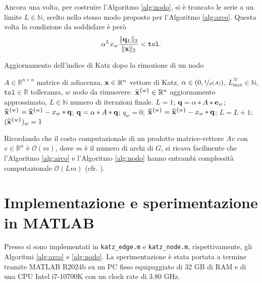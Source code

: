 \documentclass[a4paper]{article}
\newcommand{\NN}{\mathbb{N}}
\newcommand{\RR}{\mathbb{R}}
\newcommand{\evec}{{\bf e}}
\newcommand{\avec}{{\bf a}}
\newcommand{\qvec}{{\bf q}}
\newcommand{\xvec}{{\bf x}}
\newcommand{\cN}{\mathcal{N}}
\begin{document}
	Ancora una volta, per costruire l'Algoritmo \ref{alg:nodo}, si è troncato
	le serie a un limite $L \in \NN$, scelto nello stesso modo proposto
	per l'Algoritmo \ref{alg:arco}. Questa volta la condizione da soddisfare
	è però
	\[
		\alpha^L x_w \frac{\|\qvec_L\|_2}{\|\xvec\|_2} < \texttt{tol}.
	\]
	
	\begin{algorithm}[H]
		\caption{Aggiornamento dell'indice di Katz dopo la rimozione di un nodo}
		\label{alg:nodo}
		\begin{algorithmic}[1]
			\REQUIRE $A\in \RR^{n\times n}$ matrice di adiacenza, $\xvec\in \RR^{n}$ vettore di Katz, $\alpha \in (0,\nicefrac{1}{\rho(A)})$, $L_{\max}^{\cN} \in \NN$, $\texttt{tol}\in \RR$ tolleranza, $w$ nodo da rimuovere. 
			\ENSURE $\widehat{\xvec}^{\{w\}} \in \RR^{n}$ aggiornamento approssimato, $L\in \NN$ numero di iterazioni finale. 
			\STATE {$\widehat{\xvec}^{\{w\}}=\xvec$;}
			\STATE $L = 1$;
			\STATE $\qvec = \alpha* A*\evec_w$;
			\STATE $\widehat{\xvec}^{\{w\}} = \widehat{\xvec}^{\{w\}} - x_w *\qvec$;
			\WHILE {$x_w\|\qvec\|_{2}\,/\,\|\xvec\|_2  >  \texttt{tol}$ \AND  $L< L_{\max}^{\cN}$}
			\STATE $\qvec = \alpha*A*\qvec$; \label{line:compute_fpw}\label{line:mat_prod_node}
			\STATE $q_w = 0$;
			\STATE $\widehat{\xvec}^{\{w\}} = \widehat{\xvec}^{\{w\}} - x_w *\qvec$;\label{line:compute_x_w_hat} 
			\STATE $L=L+1$;
			\ENDWHILE
			\STATE $(\widehat{\xvec}^{\{w\}})_w = 1$
		\end{algorithmic}
	\end{algorithm}
	
	Ricordando che il costo computazionale di un prodotto matrice-vettore $Av$ con $v \in \RR^n$ è $\mathcal{O}(m)$, dove $m$ è il numero di archi di $G$,
	si ricava facilmente che l'Algoritmo \ref{alg:arco} e l'Algoritmo \ref{alg:nodo} hanno entrambi complessità computazionale $\mathcal{O}(Lm)$ (cfr. \cite[Proposition 8]{katz2024}).
	
	\section{Implementazione e sperimentazione in MATLAB}
	
	Presso \cite{hearotCode} si sono implementati in \texttt{katz\_edge.m} e \texttt{katz\_node.m}, rispettivamente, gli Algoritmi
	\ref{alg:arco} e \ref{alg:nodo}. La sperimentazione è stata portata a termine tramite MATLAB R2024b su un PC fisso equipaggiato di 32 GB di RAM e di
	una CPU Intel i7-10700K con un clock rate di 3.80 GHz.
	
\end{document}
